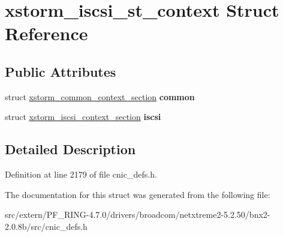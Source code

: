\hypertarget{structxstorm__iscsi__st__context}{
\section{xstorm\_\-iscsi\_\-st\_\-context Struct Reference}
\label{structxstorm__iscsi__st__context}
}
\subsection*{Public Attributes}
\begin{DoxyCompactItemize}
\item 
\hypertarget{structxstorm__iscsi__st__context_a144d0352cc87861c91903b702717726c}{
struct \hyperlink{structxstorm__common__context__section}{xstorm\_\-common\_\-context\_\-section} {\bfseries common}}
\label{structxstorm__iscsi__st__context_a144d0352cc87861c91903b702717726c}

\item 
\hypertarget{structxstorm__iscsi__st__context_a521d957e2ea4459c31676d1eac7880f3}{
struct \hyperlink{structxstorm__iscsi__context__section}{xstorm\_\-iscsi\_\-context\_\-section} {\bfseries iscsi}}
\label{structxstorm__iscsi__st__context_a521d957e2ea4459c31676d1eac7880f3}

\end{DoxyCompactItemize}


\subsection{Detailed Description}


Definition at line 2179 of file cnic\_\-defs.h.



The documentation for this struct was generated from the following file:\begin{DoxyCompactItemize}
\item 
src/extern/PF\_\-RING-\/4.7.0/drivers/broadcom/netxtreme2-\/5.2.50/bnx2-\/2.0.8b/src/cnic\_\-defs.h\end{DoxyCompactItemize}
